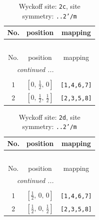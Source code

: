 \documentclass[fleqn,8pt]{jsarticle}
\begin{document}
\renewcommand{\arraystretch}{1.2}
\begin{longtable}{ccc}
\caption{Wyckoff site: {\tt 2c}, site symmetry: {\tt ..2'/m}}
 \\
 \hline \hline
No. & position & mapping \\ \hline \endfirsthead

\multicolumn{2}{l}{\tablename\ \thetable{}} \\
 \hline \hline
No. & position & mapping \\ \hline \endhead

 \hline \hline
\multicolumn{2}{r}{\footnotesize\it continued ...} \\ \endfoot

 \hline \hline
\multicolumn{2}{r}{} \\ \endlastfoot

1 & $\left[ 0,\, \frac{1}{2},\, 0 \right]$ & {\tt [1,4,6,7]} \\ \hline
2 & $\left[ 0,\, \frac{1}{2},\, \frac{1}{2} \right]$ & {\tt [2,3,5,8]} \\
\end{longtable}
\renewcommand{\arraystretch}{1.2}
\begin{longtable}{ccc}
\caption{Wyckoff site: {\tt 2d}, site symmetry: {\tt ..2'/m}}
 \\
 \hline \hline
No. & position & mapping \\ \hline \endfirsthead

\multicolumn{2}{l}{\tablename\ \thetable{}} \\
 \hline \hline
No. & position & mapping \\ \hline \endhead

 \hline \hline
\multicolumn{2}{r}{\footnotesize\it continued ...} \\ \endfoot

 \hline \hline
\multicolumn{2}{r}{} \\ \endlastfoot

1 & $\left[ \frac{1}{2},\, 0,\, 0 \right]$ & {\tt [1,4,6,7]} \\ \hline
2 & $\left[ \frac{1}{2},\, 0,\, \frac{1}{2} \right]$ & {\tt [2,3,5,8]} \\
\end{longtable}
\renewcommand{\arraystretch}{1.2}
\end{document}
